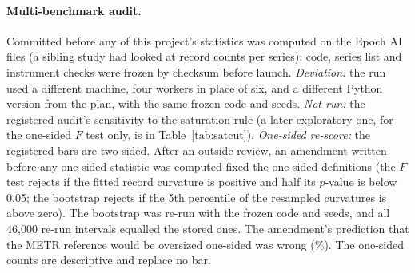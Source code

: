 \documentclass[aps,pre,twocolumn,superscriptaddress,nofootinbib,9pt]{revtex4-2}
\begin{document}
\paragraph*{Multi-benchmark audit.} Committed before any of this project's statistics was computed on the Epoch AI files (a sibling study had looked at record counts per series); code, series list and instrument checks were frozen by checksum before launch. \emph{Deviation:} the run used a different machine, four workers in place of six, and a different Python version from the plan, with the same frozen code and seeds. \emph{Not run:} the registered audit's sensitivity to the saturation rule (a later exploratory one, for the one-sided $F$ test only, is in Table~\ref{tab:satcut}). \emph{One-sided re-score:} the registered bars are two-sided. After an outside review, an amendment written before any one-sided statistic was computed fixed the one-sided definitions (the $F$ test rejects if the fitted record curvature is positive and half its $p$-value is below 0.05; the bootstrap rejects if the 5th percentile of the resampled curvatures is above zero). The bootstrap was re-run with the frozen code and seeds, and all 46{,}000 re-run intervals equalled the stored ones. The amendment's prediction that the METR reference would be oversized one-sided was wrong (\mbRefOne\%). The one-sided counts are descriptive and replace no bar.
\end{document}
